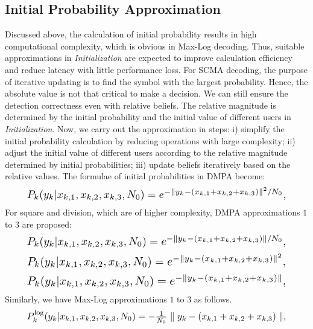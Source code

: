 \documentclass[journal,twoside]{IEEEtran}
\begin{document}
\subsection{Initial Probability Approximation}
Discussed above, the calculation of initial probability results in high computational complexity, which is obvious in Max-Log decoding. Thus, suitable approximations in \emph{Initialization} are expected to improve calculation efficiency and reduce latency with little performance loss. For SCMA decoding, the purpose of iterative updating is to find the symbol with the largest probability. Hence, the absolute value is not that critical to make a decision. We can still ensure the detection correctness even with relative beliefs. The relative magnitude is determined by the initial probability and the initial value of different users in \emph{Initialization}. Now, we carry out the approximation in steps: i) simplify the initial probability calculation by reducing operations with large complexity; ii) adjust the initial value of different users according to the relative magnitude determined by initial probabilities; iii) update beliefs iteratively based on the relative values. The formulae of initial probabilities in DMPA become:
\begin{equation}
\label{eqn:21}
\resizebox{.89\linewidth}{!}{$
P_{k}(y_{k}|x_{k,1},x_{k,2},x_{k,3},N_{0}) = e^{-\parallel y_{k}-(x_{k,1}+x_{k,2}+x_{k,3})\parallel^{2}/N_{0}},
$}
\end{equation}
For square and division, which are of higher complexity, DMPA approximations $1$ to $3$ are proposed:
\begin{equation}
\label{eqn:211}
\resizebox{.89\linewidth}{!}{$
P_{k}(y_{k}|x_{k,1},x_{k,2},x_{k,3},N_{0}) = e^{-\parallel y_{k}-(x_{k,1}+x_{k,2}+x_{k,3})\parallel/N_{0}},
$}
\end{equation}
\begin{equation}
\label{eqn:2111}
\resizebox{.89\linewidth}{!}{$
P_{k}(y_{k}|x_{k,1},x_{k,2},x_{k,3},N_{0}) = e^{-\parallel y_{k}-(x_{k,1}+x_{k,2}+x_{k,3})\parallel^{2}},
$}
\end{equation}
\begin{equation}
\label{eqn:21111}
\resizebox{.89\linewidth}{!}{$
P_{k}(y_{k}|x_{k,1},x_{k,2},x_{k,3},N_{0}) = e^{-\parallel y_{k}-(x_{k,1}+x_{k,2}+x_{k,3})\parallel},
$}
\end{equation}
Similarly, we have Max-Log approximations $1$ to $3$ as follows.
\begin{equation}
\label{equ:log11}
\resizebox{.89\linewidth}{!}{$
P_{k}^{\log}(y_{k}|x_{k,1},x_{k,2},x_{k,3},N_{0}) = -\frac{1}{N_{0}}\parallel y_{k}-(x_{k,1}+x_{k,2}+x_{k,3})\parallel,
$}
\end{equation}
\end{document}
